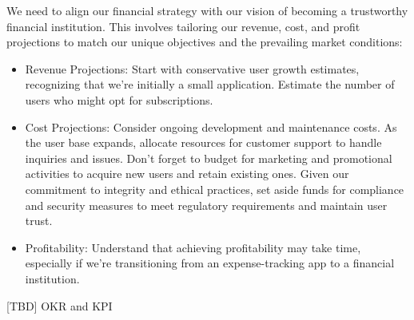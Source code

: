 We need to align our financial strategy with our vision of becoming a trustworthy financial institution. This involves 
tailoring our revenue, cost, and profit projections to match our unique objectives and the prevailing market conditions:

\begin{itemize}
  \item Revenue Projections: Start with conservative user growth estimates, recognizing that we're initially a small 
  application. Estimate the number of users who might opt for subscriptions.

  \item Cost Projections: Consider ongoing development and maintenance costs. As the user base expands, allocate 
  resources for customer support to handle inquiries and issues. Don't forget to budget for marketing and promotional 
  activities to acquire new users and retain existing ones. Given our commitment to integrity and ethical practices, 
  set aside funds for compliance and security measures to meet regulatory requirements and maintain user trust.

  \item Profitability: Understand that achieving profitability may take time, especially if we're transitioning from an 
  expense-tracking app to a financial institution.
\end{itemize}

[TBD] OKR and KPI
